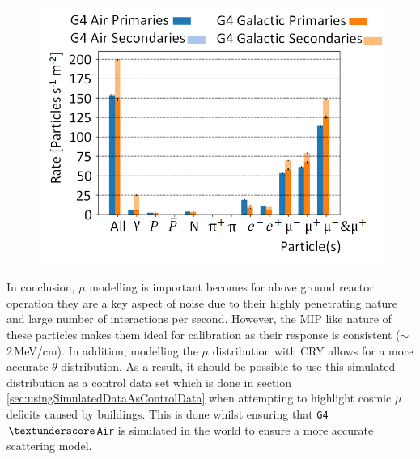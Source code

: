 \begin{figure}[!h]
 \centering
 \includegraphics[width=0.7\linewidth]{Chapter4/Figs/Raster/CryPlots/CRY_ratesMedText.png}
 \label{fig:CRY_rates}
\end{figure}

In conclusion, $\mu$ modelling is important becomes for above ground reactor operation they are a key aspect of noise due to their highly penetrating nature and large number of interactions per second. However, the MIP like nature of these particles makes them ideal for calibration as their response is consistent ($\sim$ 2\,MeV/cm). In addition, modelling the $\mu$ distribution with CRY \cite{ieee_cry_2007} allows for a more accurate $\theta$ distribution. As a result, it should be possible to use this simulated distribution as a control data set which is done in section \ref{sec:usingSimulatedDataAsControlData} when attempting to highlight cosmic $\mu$ deficits caused by buildings. This is done whilst ensuring that \texttt{G4$\textunderscore$Air} is simulated in the world to ensure a more accurate scattering model. 


